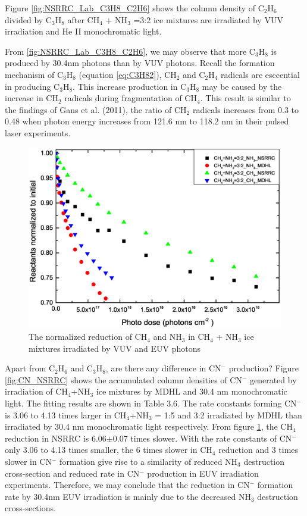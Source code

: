 Figure \ref{fig:NSRRC_Lab_C3H8_C2H6} shows the column density of C$_2$H$_6$ divided by C$_3$H$_8$ after CH$_4$ + NH$_3$ =3:2 ice mixtures are irradiated by VUV irradiation and He II monochromatic light.

From \ref{fig:NSRRC_Lab_C3H8_C2H6}, we may observe that more C$_3$H$_8$ is produced by 30.4nm photons than by VUV photons. Recall the formation mechanism of C$_3$H$_8$ (equation \ref{eq:C3H82}), CH$_2$ and C$_2$H$_4$ radicals are esccential in producing C$_3$H$_8$. This increase production in C$_3$H$_8$ may be caused by the increase in CH$_2$ radicals during fragmentation of CH$_4$. This result is similar to the findings of Gans et al. (2011)\cite{gans2011photolysis}, the ratio of CH$_2$ radicals increases from 0.3 to 0.48 when photon energy increases from 121.6 nm to 118.2 nm in their pulsed laser experiments.


\begin{figure}
\centering
\includegraphics[width=\textwidth]{figures/chapter3/Reactants_normalized_to_initial.eps}
\caption{The normalized reduction of CH$_4$ and NH$_3$ in CH$_4$ + NH$_3$ ice mixtures irradiated by VUV and EUV photons}
\label{fig:normalized_reactants}
\end{figure}


Apart from C$_2$H$_6$ and C$_3$H$_8$, are there any difference in CN$^-$ production? Figure \ref{fig:CN_NSRRC} shows the accumulated column densities of CN$^-$ generated by irradiation of CH$_4$+NH$_3$ ice mixtures by MDHL and 30.4 nm monochromatic light. The fitting results are shown in Table 3.6. The rate constants forming CN$^-$ is 3.06 to 4.13 times larger in CH$_4$+NH$_3$ = 1:5 and 3:2 irradiated by MDHL than irradiated by 30.4 nm monochromatic light respectively. From figure \ref{fig:normalized_reactants}, the CH$_4$ reduction in NSRRC is 6.06$\pm$0.07 times slower. With the rate constants of CN$^-$ only 3.06 to 4.13 times smaller, the 6 times slower in CH$_4$ reduction and 3 times slower in CN$^-$ formation give rise to a similarity of reduced NH$_3$ destruction cross-section and reduced rate in CN$^-$ production in EUV irradiation experiments. Therefore, we may conclude that the reduction in CN$^-$ formation rate by 30.4nm EUV irradiation is mainly due to the decreased NH$_3$ destruction cross-sections.

